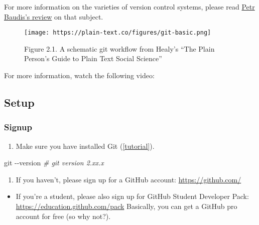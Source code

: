 \documentclass[
]{book}
\newenvironment{Shaded}{\begin{snugshade}}{\end{snugshade}}
\newcommand{\CommentTok}[1]{\textcolor[rgb]{0.56,0.35,0.01}{\textit{#1}}}
\newcommand{\FunctionTok}[1]{\textcolor[rgb]{0.00,0.00,0.00}{#1}}
\newcommand{\NormalTok}[1]{#1}
\providecommand{\tightlist}{%
  \setlength{\itemsep}{0pt}\setlength{\parskip}{0pt}}
\begin{document}
For more information on the varieties of version control systems, please read \href{https://pdfs.semanticscholar.org/4490/4c70bc91e1bed4fe02b9e2282f031b7c90ea.pdf}{Petr Baudis's review} on that subject.

\begin{figure}
\centering
\texttt{[image: https://plain-text.co/figures/git-basic.png]}
\caption{Figure 2.1. A schematic git workflow from Healy's ``The Plain Person's Guide to Plain Text Social Science''}
\end{figure}

For more information, watch the following video:

\hypertarget{setup}{%
\subsection{Setup}\label{setup}}

\hypertarget{signup}{%
\subsubsection{Signup}\label{signup}}

\begin{enumerate}
\def\labelenumi{\arabic{enumi}.}
\tightlist
\item
  Make sure you have installed Git (\href{https://happygitwithr.com/install-git.html\#install-git}{{[}tutorial{]}}).
\end{enumerate}

\begin{Shaded}
\begin{Highlighting}[]
\FunctionTok{git}\NormalTok{ {-}{-}version }
\CommentTok{\# git version 2.xx.x}
\end{Highlighting}
\end{Shaded}

\begin{enumerate}
\def\labelenumi{\arabic{enumi}.}
\setcounter{enumi}{1}
\tightlist
\item
  If you haven't, please sign up for a GitHub account: \url{https://github.com/}
\end{enumerate}

\begin{itemize}
\tightlist
\item
  If you're a student, please also sign up for GitHub Student Developer Pack: \url{https://education.github.com/pack} Basically, you can get a GitHub pro account for free (so why not?).
\end{itemize}
\end{document}
